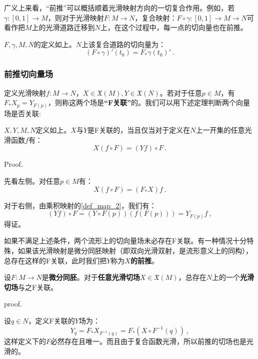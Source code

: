 广义上来看，“前推”可以概括顺着光滑映射方向的一切复合作用。例如，若$\gamma:[0,1]\rightarrow M$，则对于光滑映射$F:M\rightarrow N$，复合映射：$F\circ \gamma:[0,1]\rightarrow M\rightarrow N$可看作把$M$上的光滑道路迁移到$N$上，在这个过程中，每一点的切向量也在前推。
\begin{lemma}{}
$F,\gamma,M,N$的定义如上。$N$上该复合道路的切向量为：
\begin{equation}
(F\circ\gamma)'(t_0)=F_*\gamma(t_0)'~.
\end{equation}
\end{lemma}
\subsubsection{前推切向量场}
定义光滑映射$f:M\rightarrow N$，$X \in \mathfrak{X
}(M),Y\in \mathfrak{X}(N)$。若对于任意$p\in M$，有$F_*X_p=Y_{F(p)}$，则称这两个场是\textbf{“F关联”}的。我们可以用下述定理判断两个向量场是否关联:
\begin{theorem}{}\label{the_pfw_1}
$X,Y,M,N$定义如上。$X$与$Y$是F关联的，当且仅当对于定义在$N$上一开集的任意光滑函数$f$有：
\begin{equation}
X(f\circ F)=(Yf)\circ F~.
\end{equation}
\end{theorem}
Proof.

先看左侧。对任意$p\in M$有：
\begin{equation}
X(f\circ F)=(F_*X)f~.
\end{equation}

对于右侧，由乘积映射的\autoref{def_map_2}，我们有：
\begin{equation}
(Yf)\circ F=(Y\circ F(p))(f (F(p)))=Y_{F(p)}f~,
\end{equation}
得证。

如果不满足上述条件，两个流形上的切向量场未必存在F关联。有一种情况十分特殊，如果该光滑映射是微分同胚映射（即双向光滑双射，是流形意义上的同构），总存在这样的F关联，此时我们把$Y$称为\textbf{$X$的前推}。
\begin{theorem}{}
设$F:M\rightarrow N$是\textbf{微分同胚}。对于\textbf{任意光滑切场}$X\in \mathfrak{X}(M)$，总存在$N$上的一个\textbf{光滑切场}与之F关联。
\end{theorem}
proof.

设$q\in N$，定义F关联的$Y$场为：
\begin{equation}
Y_q=F_*X_{F^{-1}(q)}=F_*(X\circ F^{-1}(q))~,
\end{equation}
这样定义下的$F$必然存在且唯一。而且由于复合函数光滑，所以前推的切场也是光滑的。



